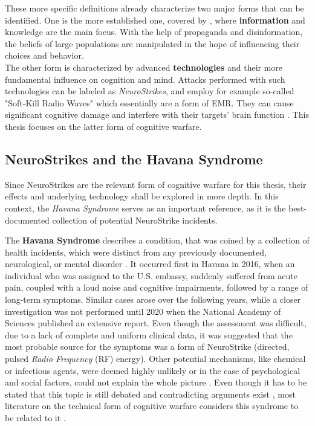        These more specific definitions already characterize two major forms that can be identified. One is the more established one, covered by \textcite{Backes.2019}, where \textbf{information} and knowledge are the main focus. With the help of propaganda and disinformation, the beliefs of large populations are manipulated in the hope of influencing their choices and behavior. \\
        The other form is characterized by advanced \textbf{technologies} and their more fundamental influence on cognition and mind. Attacks performed with such technologies can be labeled as \textit{NeuroStrikes}, and employ for example so-called "Soft-Kill Radio Waves" which essentially are a form of EMR. They can cause significant cognitive damage and interfere with their targets' brain function \cite{EADS.2023}. This thesis focuses on the latter form of cognitive warfare.

        
    \subsection{NeuroStrikes and the Havana Syndrome}
    
        Since NeuroStrikes are the relevant form of cognitive warfare for this thesis, their effects and underlying technology shall be explored in more depth. In this context, the \textit{Havana Syndrome} serves as an important reference, as it is the best-documented collection of potential NeuroStrike incidents. 
        
        The \textbf{Havana Syndrome} describes a condition, that was coined by a collection of health incidents, which were distinct from any previously documented, neurological, or mental disorder \cite{Pavlin.2020} \cite{Bartholomew.2024}. It occurred first in Havana in 2016, when an individual who was assigned to the U.S. embassy, suddenly suffered from acute pain, coupled with a loud noise and cognitive impairments, followed by a range of long-term symptoms. Similar cases arose over the following years, while a closer investigation was not performed until 2020 when the National Academy of Sciences published an extensive report. Even though the assessment was difficult, due to a lack of complete and uniform clinical data, it was suggested that the most probable source for the symptoms was a form of NeuroStrike (directed, pulsed \textit{Radio Frequency} (RF) energy). Other potential mechanisms, like chemical or infectious agents, were deemed highly unlikely or in the case of psychological and social factors, could not explain the whole picture \cite{Pavlin.2020}. Even though it has to be stated that this topic is still debated and contradicting arguments exist \cite{Bartholomew.2024}, most literature on the technical form of cognitive warfare considers this syndrome to be related to it \cite{EADS.2023} \cite{McCreight.2022} \cite{McCreight.2024}.

